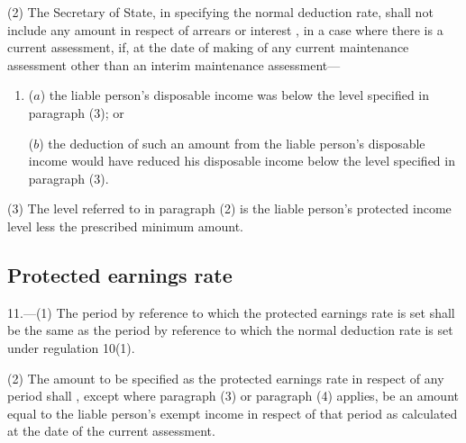 \documentclass[12pt,a4paper]{article}
\begin{document}
(2) The Secretary of State, in specifying the normal deduction rate, shall not include any amount in respect of arrears or interest%
, in a case where there is a current assessment,  %
if, 
at the date of making of any current maintenance assessment other than an interim maintenance assessment---  %
\begin{enumerate}\item[]
($a$) the liable person’s disposable income was below the level specified in paragraph (3); or

($b$) the deduction of such an amount from the liable person’s disposable income would have reduced his disposable income below the level specified in paragraph (3).
\end{enumerate}

(3) The level referred to in paragraph (2) is the liable person’s protected income level less the prescribed minimum amount.


\subsection[11. Protected earnings rate]{Protected earnings rate}

11.—(1) The period by reference to which the protected earnings rate is set shall be the same as the period by reference to which the normal deduction rate is set under regulation 10(1).

(2) The amount to be specified as the protected earnings rate in respect of any period shall%
, except where paragraph (3) or paragraph (4) applies,  %
be an amount equal to the liable person’s exempt income in respect of that period as calculated at the date of the current assessment.
\end{document}
